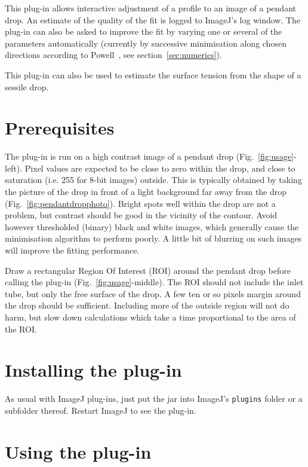 \documentclass[fleqn]{scrartcl}
\begin{document}
This plug-in allows interactive adjustment of a profile to an image of
a pendant drop. An estimate of the quality of the fit is logged to
ImageJ's log window. The plug-in can also be asked to improve the fit
by varying one or several of the parameters automatically (currently
by successive minimisation along chosen directions according to
Powell~\cite{Powell1965,Brandt1992}, see section~\ref{sec:numerics}).

This plug-in can also be used to estimate the surface tension from the
shape of a sessile drop.


\section{Prerequisites}
\label{sec:prerequisites}

The plug-in is run on a high contrast image of a pendant drop
(Fig.~\ref{fig:usage}-left). Pixel values are expected to be close to
zero within the drop, and close to saturation (i.e. 255 for 8-bit
images) outside. This is typically obtained by taking the picture of
the drop in front of a light background far away from the drop
(Fig.~\ref{fig:pendantdropphoto}). Bright spots well within the drop
are not a problem, but contrast should be good in the vicinity of the
contour. Avoid however thresholded (binary) black and white images,
which generally cause the minimisation algorithm to perform poorly. A
little bit of blurring on such images will improve the fitting
performance.

Draw a rectangular Region Of Interest (ROI) around the pendant drop
before calling the plug-in (Fig.~\ref{fig:usage}-middle). The ROI
should not include the inlet tube, but only the free surface of the
drop. A few ten or so pixels margin around the drop should be
sufficient. Including more of the outside region will not do harm, but
slow down calculations which take a time proportional to the area of
the ROI.


\section{Installing the plug-in}
\label{sec:installation}

As usual with ImageJ plug-ins, just put the jar into ImageJ's
\texttt{plugins} folder or a subfolder thereof. Restart ImageJ to see
the plug-in.


\section{Using the plug-in}
\label{sec:usage}
\end{document}
